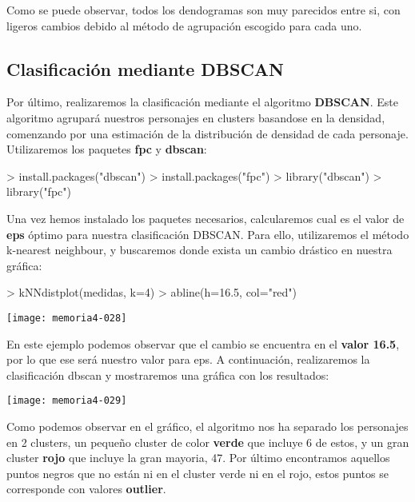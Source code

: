 \documentclass [a4paper] {article}
\begin{document}
Como se puede observar, todos los dendogramas son muy parecidos entre si, con ligeros cambios debido al método de agrupación escogido
para cada uno.

\subsection{Clasificación mediante DBSCAN}

Por último, realizaremos la clasificación mediante el algoritmo \textbf{DBSCAN}. Este algoritmo agrupará nuestros personajes en clusters
basandose en la densidad, comenzando por una estimación de la distribución de densidad de cada personaje. Utilizaremos los paquetes
\textbf{fpc} y \textbf{dbscan}:

\begin{Schunk}
\begin{Sinput}
> install.packages("dbscan")
> install.packages("fpc")
> library("dbscan")
> library("fpc")
\end{Sinput}
\end{Schunk}

Una vez hemos instalado los paquetes necesarios, calcularemos cual es el valor de \textbf{eps} óptimo para nuestra clasificación DBSCAN.
Para ello, utilizaremos el método k-nearest neighbour, y buscaremos donde exista un cambio drástico en nuestra gráfica:

\begin{Schunk}
\begin{Sinput}
> kNNdistplot(medidas, k=4)
> abline(h=16.5, col="red")
\end{Sinput}
\end{Schunk}
\texttt{[image: memoria4-028]}

En este ejemplo podemos observar que el cambio se encuentra en el \textbf{valor 16.5}, por lo que ese será nuestro valor para eps. A continuación,
realizaremos la clasificación dbscan y mostraremos una gráfica con los resultados:

\begin{Schunk}
\end{Schunk}
\texttt{[image: memoria4-029]}

Como podemos observar en el gráfico, el algoritmo nos ha separado los personajes en 2 clusters, un pequeño cluster de color \textbf{verde}
que incluye 6 de estos, y un gran cluster \textbf{rojo} que incluye la gran mayoria, 47. Por último encontramos aquellos puntos negros que
no están ni en el cluster verde ni en el rojo, estos puntos se corresponde con valores \textbf{outlier}.
\end{document}
